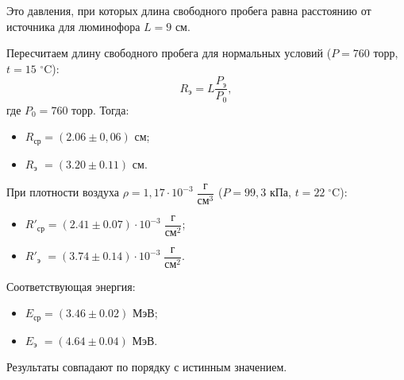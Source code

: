 \documentclass{article}
\begin{document}
Это давления, при которых длина свободного пробега равна расстоянию от источника для люминофора $L = 9$ см. 
		
		Пересчитаем длину свободного пробега для нормальных условий ($P = 760$ торр, $t = 15$ $^\circ$C):
		\begin{equation*}
			R_\text{э} = L\frac{P_\text{э}}{P_0}, 
		\end{equation*}
		\noindent где $P_0 = 760$ торр. Тогда:
		
		\begin{itemize}
			\item $R_\text{ср} = (2.06 \pm 0,06) \text{ см}$;
			
			
			\item $R_\text{э} \,\, = (3.20 \pm 0.11) \text{ см}$.
		\end{itemize}
		
		При плотности воздуха $\rho = 1,17 \cdot 10^{-3} \;\dfrac{\text{г}}{\text{см}^3}$ ($P = 99,3 \text{ кПа}$, $t = 22\;^\circ \text{C}$):
		\begin{itemize}
			\item $R'_\text{ср} = (2.41 \pm 0.07) \cdot 10^{-3} \;\dfrac{\text{г}}{\text{см}^2}$;
			
			
			\item $R'_\text{э} \,\, = (3.74 \pm 0.14) \cdot 10^{-3} \;\dfrac{\text{г}}{\text{см}^2}$.
		\end{itemize}
		
		Соответствующая энергия:
		\begin{itemize}
			\item $E_\text{ср} = (3.46 \pm 0.02) \text{ МэВ}$;
			
			\item $E_\text{э} \,\, = (4.64 \pm 0.04) \text{ МэВ}$.
		\end{itemize}
	
		Результаты совпадают по порядку с истинным значением.
\end{document}
